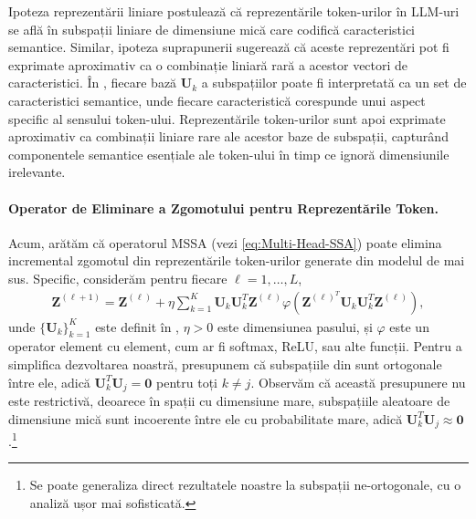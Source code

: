 \documentclass[../../book-main_ro.tex]{subfiles}
\begin{document}
\begin{remark}
    Ipoteza reprezentării liniare postulează că reprezentările token-urilor în LLM-uri se află în subspații liniare de dimensiune mică care codifică caracteristici semantice. Similar, ipoteza suprapunerii sugerează că aceste reprezentări pot fi exprimate aproximativ ca o combinație liniară rară a acestor vectori de caracteristici. În , fiecare bază $\bm U_k$ a subspațiilor poate fi interpretată ca un set de caracteristici semantice, unde fiecare caracteristică corespunde unui aspect specific al sensului token-ului. Reprezentările token-urilor sunt apoi exprimate aproximativ ca combinații liniare rare ale acestor baze de subspații, capturând componentele semantice esențiale ale token-ului în timp ce ignoră dimensiunile irelevante.
\end{remark}

\paragraph{Operator de Eliminare a Zgomotului pentru Reprezentările Token.} Acum, arătăm că operatorul MSSA (vezi \eqref{eq:Multi-Head-SSA}) poate elimina incremental zgomotul din reprezentările token-urilor generate din modelul de mai sus. Specific, considerăm pentru fiecare $\ell =1 ,\dots,L$,
\begin{align}\label{eq:MSSA}
    \bm Z^{(\ell+1)} =  \bm Z^{(\ell)} + \eta \sum_{k=1}^K \bm U_k\bm U_k^T \bm Z^{(\ell)} \varphi \left(\bm Z^{(\ell)^T}\bm U_k\bm U_k^T\bm Z^{(\ell)} \right),
\end{align}
unde $\{\bm U_k\}_{k=1}^K$ este definit în , $\eta > 0$ este dimensiunea pasului, și $\varphi$ este un operator element cu element, cum ar fi softmax, ReLU, sau alte funcții. Pentru a simplifica dezvoltarea noastră, presupunem că subspațiile din  sunt ortogonale între ele, adică $\bm U_k^T\bm U_j = \bm 0$ pentru toți $k \neq j$. Observăm că această presupunere nu este restrictivă, deoarece în spații cu dimensiune mare, subspațiile aleatoare de dimensiune mică sunt incoerente între ele cu probabilitate mare, adică $\bm U_k^T\bm U_j \approx \bm 0$ \citep{Wright-Ma-2021}.\footnote{Se poate generaliza direct rezultatele noastre la subspații ne-ortogonale, cu o analiză ușor mai sofisticată.}
\end{document}
